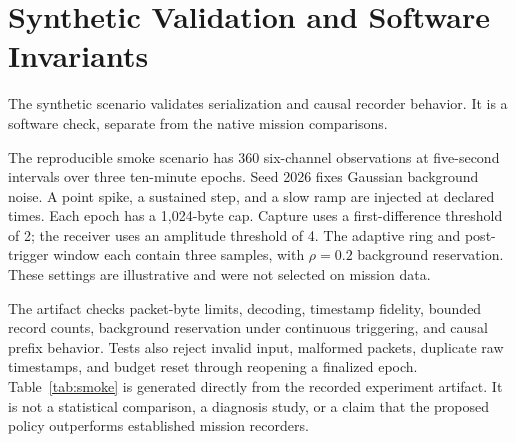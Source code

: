\section{Synthetic Validation and Software Invariants}
\label{app:checks}
The synthetic scenario validates serialization and causal recorder behavior.
It is a software check, separate from the native mission comparisons.


The reproducible smoke scenario has 360 six-channel observations at five-second
intervals over three ten-minute epochs. Seed 2026 fixes Gaussian background noise.
A point spike, a sustained step, and a slow ramp are injected at declared times.
Each epoch has a 1,024-byte cap. Capture uses a first-difference threshold of 2;
the receiver uses an amplitude threshold of 4. The adaptive ring and post-trigger
window each contain three samples, with $\rho=0.2$ background reservation.
These settings are illustrative and were not selected on mission data.

\begin{table}[ht]
\centering
\footnotesize

\caption{Synthetic protocol check only. Each policy has the same three-epoch
allocation of 3,072 bytes. Raw event coverage here counts events with at least
one retained raw observation, not a per-event sample fraction. Receiver evidence
for summaries is coarse bucket evidence. Actual expenditure differs by policy.}
\label{tab:smoke}
\end{table}

The artifact checks packet-byte limits, decoding, timestamp fidelity, bounded
record counts, background reservation under continuous triggering, and causal
prefix behavior. Tests also reject invalid input, malformed packets, duplicate
raw timestamps, and budget reset through reopening a finalized epoch.
Table~\ref{tab:smoke} is generated directly from the recorded experiment artifact.
It is not a statistical comparison, a diagnosis study, or a claim that the proposed
policy outperforms established mission recorders.
